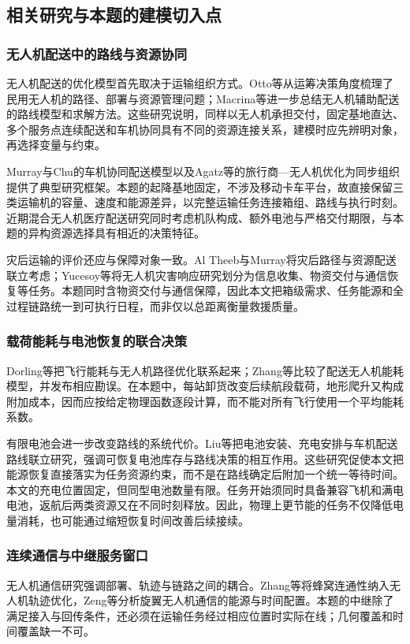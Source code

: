 \subsection{相关研究与本题的建模切入点}
\label{sec:research_position}
\subsubsection{无人机配送中的路线与资源协同}
无人机配送的优化模型首先取决于运输组织方式。Otto等从运筹决策角度梳理了民用无人机的路径、部署与资源管理问题\cite{otto2018}；Macrina等进一步总结无人机辅助配送的路线模型和求解方法\cite{macrina2020}。这些研究说明，同样以无人机承担交付，固定基地直达、多个服务点连续配送和车机协同具有不同的资源连接关系，建模时应先辨明对象，再选择变量与约束。

Murray与Chu的车机协同配送模型\cite{murray2015fstsp}以及Agatz等的旅行商—无人机优化\cite{agatz2018}为同步组织提供了典型研究框架。本题的起降基地固定，不涉及移动卡车平台，故直接保留三类运输机的容量、速度和能源差异，以完整运输任务连接箱组、路线与执行时刻。近期混合无人机医疗配送研究同时考虑机队构成、额外电池与严格交付期限\cite{bhuiyan2026}，与本题的异构资源选择具有相近的决策特征。

灾后运输的评价还应与保障对象一致。Al Theeb与Murray将灾后路径与资源配送联立考虑\cite{altheeb2017relief}；Yucesoy等将无人机灾害响应研究划分为信息收集、物资交付与通信恢复等任务\cite{yucesoy2025}。本题同时含物资交付与通信保障，因此本文把箱级需求、任务能源和全过程链路统一到可执行日程，而非仅以总距离衡量救援质量。

\subsubsection{载荷能耗与电池恢复的联合决策}
Dorling等把飞行能耗与无人机路径优化联系起来\cite{dorling2017}；Zhang等比较了配送无人机能耗模型，并发布相应勘误\cite{zhang2021energy,zhang2023corrigendum}。在本题中，每站卸货改变后续航段载荷，地形爬升又构成附加成本，因而应按给定物理函数逐段计算，而不能对所有飞行使用一个平均能耗系数。

有限电池会进一步改变路线的系统代价。Liu等把电池安装、充电安排与车机配送路线联立研究\cite{liu2025battery}，强调可恢复电池库存与路线决策的相互作用。这些研究促使本文把能源恢复直接落实为任务资源约束，而不是在路线确定后附加一个统一等待时间。本文的充电位置固定，但同型电池数量有限。任务开始须同时具备兼容飞机和满电电池，返航后两类资源又在不同时刻释放。因此，物理上更节能的任务不仅降低电量消耗，也可能通过缩短恢复时间改善后续接续。

\subsubsection{连续通信与中继服务窗口}
无人机通信研究强调部署、轨迹与链路之间的耦合\cite{zeng2016uavcom,zeng2019sky}。Zhang等将蜂窝连通性纳入无人机轨迹优化\cite{zhang2019cellular}，Zeng等分析旋翼无人机通信的能源与时间配置\cite{zeng2019energy}。本题的中继除了满足接入与回传条件，还必须在运输任务经过相应位置时实际在线；几何覆盖和时间覆盖缺一不可。

